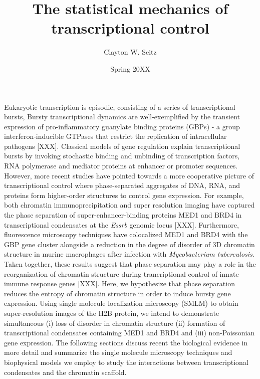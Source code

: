 \documentclass{ucetd}
\title{The statistical mechanics of transcriptional control}
\author{Clayton W. Seitz}
\date{Spring 20XX}
\begin{document}
\maketitle

\makecopyright


\tableofcontents


\abstract

Eukaryotic transcription is episodic, consisting of a series of transcriptional bursts, Bursty transcriptional dynamics are well-exemplified by the transient expression of pro-inflammatory guanylate binding proteins (GBPs) - a group interferon-inducible GTPases that restrict the replication of intracellular pathogens [XXX]. Classical models of gene regulation explain transcriptional bursts by invoking stochastic binding and unbinding of transcription factors, RNA polymerase and mediator proteins at enhancer or promoter sequences. However, more recent studies have pointed towards a more cooperative picture of transcriptional control where phase-separated aggregates of DNA, RNA, and proteins form higher-order structures to control gene expression. For example, both chromatin immunoprecipitation and super resolution imaging have captured the phase separation of super-enhancer-binding proteins MED1 and BRD4 in transcriptional condensates at the \textit{Essrb} genomic locus [XXX]. Furthermore, fluorescence microscopy techniques have colocalized MED1 and BRD4 with the GBP gene cluster alongside a reduction in the degree of disorder of 3D chromatin structure in murine macrophages after infection with \textit{Mycobacterium tuberculosis}. Taken together, these results suggest that phase separation may play a role in the reorganization of chromatin structure during trancriptional control of innate immune response genes [XXX]. Here, we hypothesize that phase separation reduces the entropy of chromatin structure in order to induce bursty gene expression. Using single molecule localization microscopy (SMLM) to obtain super-resolution images of the H2B protein, we intend to demonstrate simultaneous (i) loss of disorder in chromatin structure (ii) formation of transcriptional condensates containing MED1 and BRD4 and (iii) non-Poissonian gene expression. The following sections discuss recent the biological evidence in more detail and summarize the single molecule microscopy techniques and biophysical models we employ to study the interactions between transcriptional condensates and the chromatin scaffold.
\end{document}

